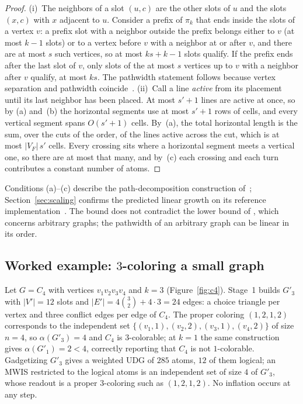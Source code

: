 \documentclass[a4paper,fleqn]{cas-sc}
\newcommand{\indep}{\alpha}
\begin{document}
\begin{proof}
(i)~The neighbors of a slot $(u,c)$ are the other slots of $u$ and the slots
$(x,c)$ with $x$ adjacent to $u$. Consider a prefix of $\pi_k$ that ends inside
the slots of a vertex $v$: a prefix slot with a neighbor outside the prefix
belongs either to $v$ (at most $k-1$ slots) or to a vertex before $v$ with a
neighbor at or after $v$, and there are at most $s$ such vertices, so at most
$ks+k-1$ slots qualify. If the prefix ends after the last slot of $v$, only slots
of the at most $s$ vertices up to $v$ with a neighbor after $v$ qualify, at most
$ks$. The pathwidth statement follows because vertex separation and pathwidth
coincide~\cite{Kinnersley1992}.
(ii)~Call a line \emph{active} from its placement until its last neighbor has been
placed. At most $s'+1$ lines are active at once, so by (a) and~(b) the horizontal
segments use at most $s'+1$ rows of cells, and every vertical segment spans
$O(s'+1)$ cells. By~(a), the total horizontal length is the sum, over the cuts of
the order, of the lines active across the cut, which is at most $|V_F|\,s'$ cells.
Every crossing sits where a horizontal segment meets a vertical one, so there are at
most that many, and by~(c) each crossing and each turn contributes a constant number
of atoms.
\end{proof}

\noindent Conditions (a)--(c) describe the path-decomposition construction
of~\citet[App.~A]{Nguyen2023}; Section~\ref{sec:scaling} confirms the predicted
linear growth on its reference implementation~\cite{UnitDiskMapping}. The bound does
not contradict the lower bound of \citet{Cazals2025}, which concerns arbitrary graphs;
the pathwidth of an arbitrary graph can be linear in its order.

\subsection{\texorpdfstring{Worked example: $3$-coloring a small graph}{Worked example: 3-coloring a small graph}}
\label{sec:gadget-example}

\begin{example}
\label{ex:c4}
Let $G=C_4$ with vertices $v_1v_2v_3v_4$ and $k=3$ (Figure~\ref{fig:c4}). Stage~1
builds $G'_3$ with $|V'|=12$ slots and $|E'|=4\binom{3}{2}+4\cdot3=24$ edges: a choice
triangle per vertex and three conflict edges per edge of $C_4$. The proper coloring
$(1,2,1,2)$ corresponds to the independent set
$\{(v_1,1),(v_2,2),(v_3,1),(v_4,2)\}$ of size $n=4$, so $\indep(G'_3)=4$ and $C_4$ is
$3$-colorable; at $k=1$ the same construction gives $\indep(G'_1)=2<4$, correctly
reporting that $C_4$ is not $1$-colorable. Gadgetizing $G'_3$ gives a weighted UDG of
$285$ atoms, $12$ of them logical; an MWIS restricted to the logical atoms is an
independent set of size $4$ of $G'_3$, whose readout is a proper $3$-coloring such as
$(1,2,1,2)$. No inflation occurs at any step.
\end{example}
\end{document}
